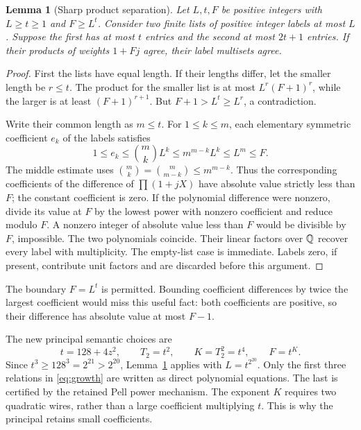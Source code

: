 \documentclass[11pt]{article}
\newtheorem{lemma}[theorem]{Lemma}
\theoremstyle{definition}\newtheorem{remark}[theorem]{Remark}
\begin{document}
\begin{lemma}[Sharp product separation]\label{lem:separate}
Let $L,t,F$ be positive integers with $L\ge t\ge1$ and $F\ge L^t$.
Consider two finite lists of positive
integer labels at most $L$. Suppose the first has at most $t$ entries
and the second at most $2t+1$ entries. If their products of weights
$1+Fj$ agree, their label multisets agree.
\end{lemma}
\begin{proof}
First the lists have equal length. If their lengths differ, let the
smaller length be $r\le t$. The product for the smaller list is at most
$L^r(F+1)^r$, while the larger is at least $(F+1)^{r+1}$.
But $F+1>L^t\ge L^r$, a contradiction.

Write their common length as $m\le t$. For $1\le k\le m$, each
elementary symmetric coefficient $e_k$ of the labels satisfies
\[
 1\le e_k\le \binom{m}{k}L^k
       \le m^{m-k}L^k\le L^m\le F.
\]
The middle estimate uses $\binom{m}{k}=\binom{m}{m-k}\le m^{m-k}$.
Thus the corresponding coefficients of the difference of
$\prod(1+jX)$ have absolute value strictly less than $F$; the constant
coefficient is zero. If the polynomial difference were nonzero, divide
its value at $F$ by the lowest power with nonzero coefficient and reduce
modulo $F$. A nonzero integer of absolute value less than $F$ would be
divisible by $F$, impossible. The two polynomials coincide. Their linear
factors over $\mathbb Q$ recover every label with multiplicity. The empty-list
case is immediate. Labels zero, if present, contribute unit factors and
are discarded before this argument.
\end{proof}

The boundary $F=L^t$ is permitted. Bounding coefficient differences by
twice the largest coefficient would miss this useful fact: both coefficients
are positive, so their difference has absolute value at most $F-1$.

The new principal semantic choices are
\begin{equation}\label{eq:growth}
 t=128+4z^2,\qquad T_2=t^2,\qquad K=T_2^2=t^4,
 \qquad F=t^K.
\end{equation}
Since $t^3\ge128^3=2^{21}>2^{20}$, Lemma~\ref{lem:separate}
applies with $L=t^{2^{20}}$. Only the first three relations in
\eqref{eq:growth} are written as direct polynomial equations. The last
is certified by the retained Pell power mechanism. The exponent $K$
requires two quadratic wires, rather than a large coefficient multiplying
$t$. This is why the principal retains small coefficients.
\end{document}
